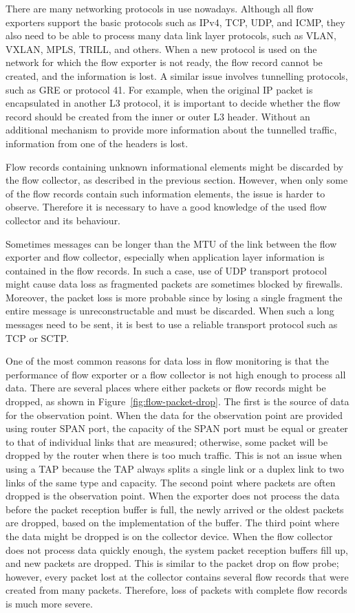 There are many networking protocols in use nowadays. Although all flow exporters support the basic protocols such as IPv4, TCP, UDP, and ICMP, they also need to be able to process many data link layer protocols, such as VLAN, VXLAN, MPLS, TRILL, and others. When a new protocol is used on the network for which the flow exporter is not ready, the flow record cannot be created, and the information is lost. A similar issue involves tunnelling protocols, such as GRE or protocol 41. For example, when the original IP packet is encapsulated in another L3 protocol, it is important to decide whether the flow record should be created from the inner or outer L3 header. Without an additional mechanism to provide more information about the tunnelled traffic, information from one of the headers is lost.

Flow records containing unknown informational elements might be discarded by the flow collector, as described in the previous section. However, when only some of the flow records contain such information elements, the issue is harder to observe. Therefore it is necessary to have a good knowledge of the used flow collector and its behaviour.

Sometimes messages can be longer than the MTU of the link between the flow exporter and flow collector, especially when application layer information is contained in the flow records. In such a case, use of UDP transport protocol might cause data loss as fragmented packets are sometimes blocked by firewalls. Moreover, the packet loss is more probable since by losing a single fragment the entire message is unreconstructable and must be discarded. When such a long messages need to be sent, it is best to use a reliable transport protocol such as TCP or SCTP.

One of the most common reasons for data loss in flow monitoring is that the performance of flow exporter or a flow collector is not high enough to process all data. There are several places where either packets or flow records might be dropped, as shown in Figure~\ref{fig:flow-packet-drop}. The first is the source of data for the observation point. When the data for the observation point are provided using router SPAN port, the capacity of the SPAN port must be equal or greater to that of individual links that are measured; otherwise, some packet will be dropped by the router when there is too much traffic. This is not an issue when using a TAP because the TAP always splits a single link or a duplex link to two links of the same type and capacity. The second point where packets are often dropped is the observation point. When the exporter does not process the data before the packet reception buffer is full, the newly arrived or the oldest packets are dropped, based on the implementation of the buffer. The third point where the data might be dropped is on the collector device. When the flow collector does not process data quickly enough, the system packet reception buffers fill up, and new packets are dropped. This is similar to the packet drop on flow probe; however, every packet lost at the collector contains several flow records that were created from many packets. Therefore, loss of packets with complete flow records is much more severe.

